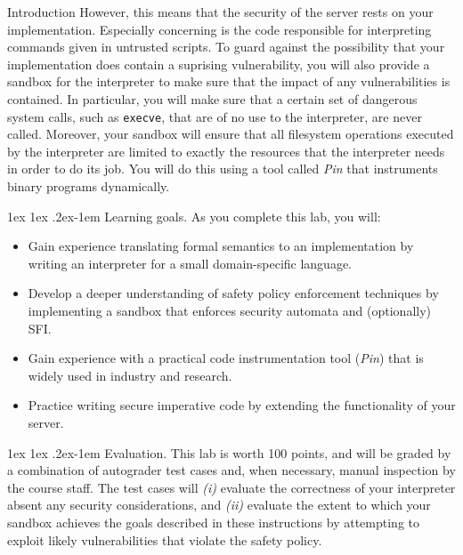 \documentclass[11pt]{article}
\makeatletter
\renewcommand{\paragraph}{%
  \@startsection{paragraph}{4}%
  {\z@}{1ex \@plus 1ex \@minus .2ex}{-1em}%
  {\normalfont\normalsize\bfseries}
}
\makeatother
\begin{document}
\begin{problem}{Introduction}
    However, this means that the security of the server rests on your implementation. Especially concerning is the code responsible for interpreting commands given in untrusted scripts. 
    To guard against the possibility that your implementation does contain a suprising vulnerability, you will also provide a sandbox for the interpreter to make sure that the impact of any vulnerabilities is contained. In particular, you will make sure that a certain set of dangerous system calls, such as \verb'execve', that are of no use to the interpreter, are never called. Moreover, your sandbox will ensure that all filesystem operations executed by the interpreter are limited to exactly the resources that the interpreter needs in order to do its job. 
    You will do this using a tool called \emph{Pin} that instruments binary programs dynamically.
  
  \paragraph{Learning goals.}
    As you complete this lab, you will:
    \begin{itemize}[noitemsep,topsep=0pt]
      \item Gain experience translating formal semantics to an implementation by writing an interpreter for a small domain-specific language.
      \item Develop a deeper understanding of safety policy enforcement techniques by implementing a sandbox that enforces security automata and (optionally) SFI.
      \item Gain experience with a practical code instrumentation tool (\emph{Pin}) that is widely used in industry and research.
      \item Practice writing secure imperative code by extending the functionality of your server.
    \end{itemize}
  \paragraph{Evaluation.}
    This lab is worth 100 points, and will be graded by a combination of autograder test cases and, when necessary, manual inspection by the course staff. The test cases will \emph{(i)} evaluate the correctness of your interpreter absent any security considerations, and \emph{(ii)} evaluate the extent to which your sandbox achieves the goals described in these instructions by attempting to exploit likely vulnerabilities that violate the safety policy. 
    

\end{problem}
\end{document}
